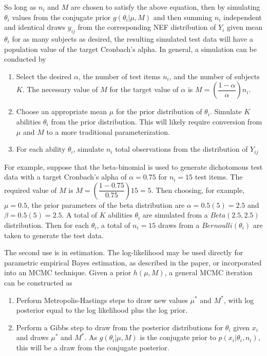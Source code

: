 \documentclass[12pt,epsfig]{article}
\begin{document}
\noindent So long as $n_i$ and $M$ are chosen to satisfy the above equation, then by simulating $\theta_i$ values from the conjugate prior $g(\theta_i | \mu, M)$ and then summing $n_i$ independent and identical draws $y_{ij}$ from the corresponding NEF distribution of $Y_i$ given mean $\theta_i$ for as many subjects as desired, the resulting simulated test data will have a population value of the target Cronbach's alpha. In general, a simulation can be conducted by

\begin{enumerate}
    \item Select the desired $\alpha$, the number of test items $n_i$, and the number of subjects $K$. The necessary value of $M$ for the target value of $\alpha$ is $M = \left(\dfrac{1-\alpha}{\alpha}\right) n_i$.
    \item Choose an appropriate mean $\mu$ for the prior distribution of $\theta_i$. Simulate $K$ abilities $\theta_i$ from the prior distribution. This will likely require conversion from $\mu$ and $M$ to a more traditional parameterization.
    \item For each ability $\theta_i$, simulate $n_i$ total observations from the distribution of $Y_{ij}$
\end{enumerate}

For example, suppose that the beta-binomial is used to generate dichotomous test data with a target Cronbach's alpha of $\alpha = 0.75$ for $n_i = 15$ test items. The required value of $M$ is $M = \left(\dfrac{1-0.75}{0.75}\right) 15 = 5$. Then choosing, for example, $\mu = 0.5$, the prior parameters of the beta distribution are $\alpha = 0.5(5) = 2.5$ and $\beta = 0.5(5) = 2.5$. A total of $K$ abilities $\theta_i$ are simulated from a $Beta(2.5, 2.5)$ distribution. Then for each $\theta_i$, a total of $n_i = 15$ draws from a $Bernoulli(\theta_i)$ are taken to generate the test data. 

The second use is in estimation.  The log-likelihood may be used directly for parametric empirical Bayes estimation, as described in the paper, or incorporated into an MCMC technique. Given a prior $h(\mu, M)$, a general MCMC iteration can be constructed as

\begin{enumerate}
    \item Perform Metropolis-Hastings steps to draw new values $\mu^*$ and $M^*$, with log posterior equal to the log likelihood plus the log prior.
    \item Perform a Gibbs step to draw from the posterior distributions for $\theta_i$ given $x_i$ and draws $\mu^*$ and $M^*$. As $g(\theta_i | \mu, M)$ is the conjugate prior to $p(x_i | \theta_i, n_i)$, this will be a draw from the conjugate posterior. %
\end{enumerate}
\end{document}
